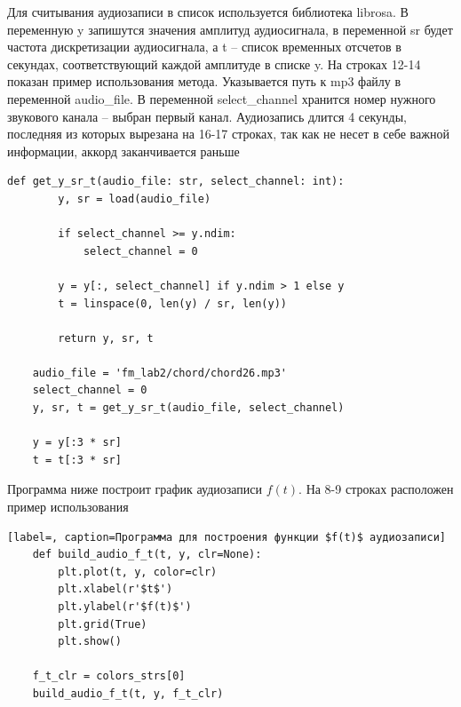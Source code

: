 \documentclass[a4paper, 16pt]{article}
\begin{document}
    \noindent Для считывания аудиозаписи в список используется библиотека librosa. В переменную y запишутся значения амплитуд аудиосигнала,
    в переменной sr будет частота дискретизации аудиосигнала, а t -- список временных отсчетов в секундах, соответствующий каждой амплитуде в списке y.
    На строках 12-14 показан пример использования метода. Указывается путь к mp3 файлу в переменной audio\_{file}. В переменной select\_{channel} хранится номер
    нужного звукового канала -- выбран первый канал. Аудиозапись длится 4 секунды, последняя из которых вырезана на 16-17 строках, так как не несет в себе
    важной информации, аккорд заканчивается раньше
    \begin{lstlisting}[label=mp3load, caption=Программа для считывания аудиозаписи в список]
    def get_y_sr_t(audio_file: str, select_channel: int):
        y, sr = load(audio_file)
    
        if select_channel >= y.ndim:
            select_channel = 0
    
        y = y[:, select_channel] if y.ndim > 1 else y
        t = linspace(0, len(y) / sr, len(y))
    
        return y, sr, t

    audio_file = 'fm_lab2/chord/chord26.mp3'
    select_channel = 0
    y, sr, t = get_y_sr_t(audio_file, select_channel)

    y = y[:3 * sr]
    t = t[:3 * sr]
    \end{lstlisting}


    \noindent Программа ниже построит график аудиозаписи $f(t)$. На 8-9 строках расположен пример
    использования
    \begin{lstlisting}[label=, caption=Программа для построения функции $f(t)$ аудиозаписи]
    def build_audio_f_t(t, y, clr=None):
        plt.plot(t, y, color=clr)
        plt.xlabel(r'$t$')
        plt.ylabel(r'$f(t)$')
        plt.grid(True)
        plt.show()

    f_t_clr = colors_strs[0]
    build_audio_f_t(t, y, f_t_clr)
    \end{lstlisting}
\end{document}

